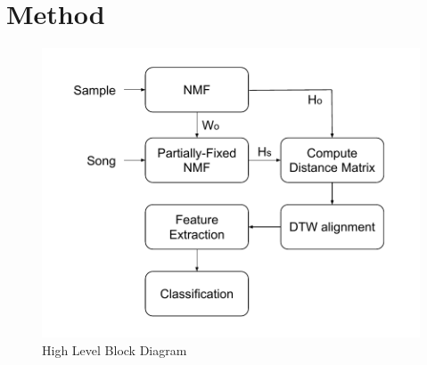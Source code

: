\documentclass{article}
\begin{document}


\section{Method}
\label{algo}

\begin{figure}[!ht]
\centering
\includegraphics[width=\linewidth]{block_diagram.pdf}
\caption{High Level Block Diagram}
\label{fig_block}
\end{figure}
\end{document}
